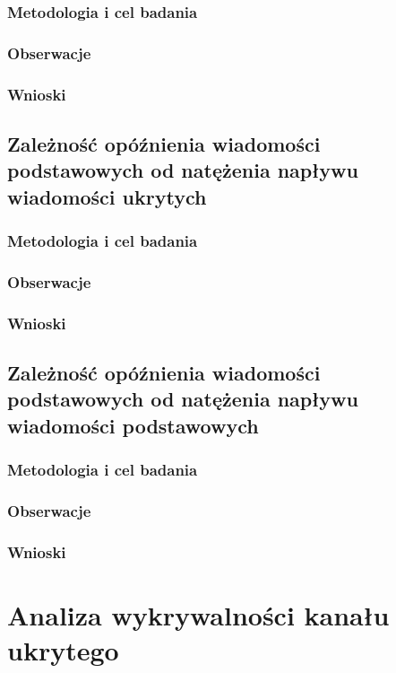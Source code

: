 \documentclass[a4paper, twoside]{report}
\begin{document}
        \subsection{Metodologia i cel badania}
        \subsection{Obserwacje}
        \subsection{Wnioski}

    \section{Zależność opóźnienia wiadomości podstawowych od natężenia napływu wiadomości ukrytych}
        \subsection{Metodologia i cel badania}
        \subsection{Obserwacje}
        \subsection{Wnioski}

    \section{Zależność opóźnienia wiadomości podstawowych od natężenia napływu wiadomości podstawowych}
        \subsection{Metodologia i cel badania}
        \subsection{Obserwacje}
        \subsection{Wnioski}


\chapter{Analiza wykrywalności kanału ukrytego}
\end{document}
